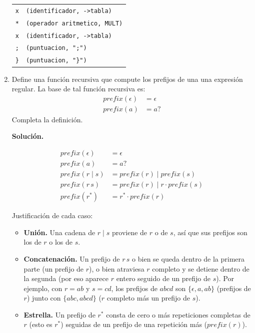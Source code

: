 \documentclass[12pt, letterpaper]{article}
\begin{document}
\begin{enumerate}
\begin{center}
\begin{tabular}{ll}
        \texttt{x}              & \texttt{(identificador, ->tabla)} \\
        \texttt{*}              & \texttt{(operador aritmetico, MULT)} \\
        \texttt{x}              & \texttt{(identificador, ->tabla)} \\
        \texttt{;}              & \texttt{(puntuacion, ";")} \\
        \texttt{\}}             & \texttt{(puntuacion, "\}")} \\
        \bottomrule
      \end{tabular}
    \end{center}





  \item Define una función recursiva que compute los prefijos de una una expresión regular. 
    La base de tal función recursiva es:
    \begin{align*}
      prefix(\epsilon) &= \epsilon \\
      prefix(a) &= a?
    \end{align*}
    Completa la definición.

    \bigskip
    \noindent\textbf{Solución.} 

    \begin{align*}
      prefix(\epsilon) &= \epsilon \\
      prefix(a) &= a? \\
      prefix(r \mid s) &= prefix(r) \mid prefix(s) \\
      prefix(r\,s) &= prefix(r) \mid r\cdot prefix(s) \\
      prefix(r^{*}) &= r^{*}\cdot prefix(r)
    \end{align*}

    \noindent Justificación de cada caso:
    \begin{itemize}[nosep]
    \item \textbf{Unión.} Una cadena de $r\mid s$ proviene de $r$ o de $s$, así que sus
      prefijos son los de $r$ o los de $s$.
    \item \textbf{Concatenación.} Un prefijo de $r\,s$ o bien se queda dentro de la
      primera parte (un prefijo de $r$), o bien atraviesa $r$ completo y se detiene dentro
      de la segunda (por eso aparece $r$ entero seguido de un prefijo de $s$). Por ejemplo,
      con $r=ab$ y $s=cd$, los prefijos de $abcd$ son $\{\epsilon, a, ab\}$ (prefijos de
      $r$) junto con $\{abc, abcd\}$ ($r$ completo más un prefijo de $s$).
    \item \textbf{Estrella.} Un prefijo de $r^{*}$ consta de cero o más repeticiones
      completas de $r$ (esto es $r^{*}$) seguidas de un prefijo de una repetición más
      ($prefix(r)$).
    \end{itemize}


\end{enumerate}
\end{document}
